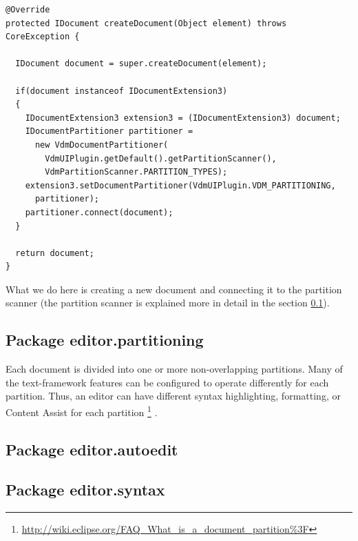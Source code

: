 \begin{lstlisting}
@Override
protected IDocument createDocument(Object element) throws CoreException {

  IDocument document = super.createDocument(element);

  if(document instanceof IDocumentExtension3)
  {
    IDocumentExtension3 extension3 = (IDocumentExtension3) document;
    IDocumentPartitioner partitioner = 
      new VdmDocumentPartitioner(
        VdmUIPlugin.getDefault().getPartitionScanner(), 	
        VdmPartitionScanner.PARTITION_TYPES);
    extension3.setDocumentPartitioner(VdmUIPlugin.VDM_PARTITIONING, 
      partitioner);
    partitioner.connect(document);			
  }

  return document;
}
\end{lstlisting}
What we do here is creating a new document and connecting it to the partition scanner (the partition scanner is explained more in detail in the section \ref{editor:partitioning}). 




\subsection{Package editor.partitioning}
\label{editor:partitioning}
Each document is divided into one or more non-overlapping partitions. Many of the text-framework features can be configured to operate differently for each partition. Thus, an editor can have different syntax highlighting, formatting, or Content Assist for each partition \footnote{\url{http://wiki.eclipse.org/FAQ_What_is_a_document_partition\%3F}} . 




\subsection{Package editor.autoedit}

\subsection{Package editor.syntax}


